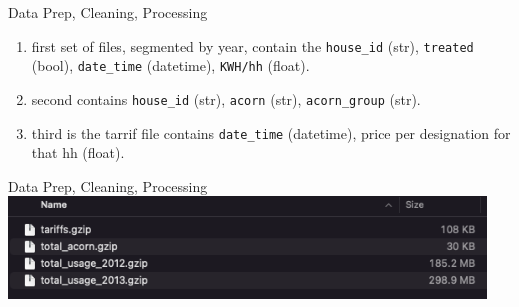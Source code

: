 \documentclass{beamer}
\begin{document}
\begin{frame}{Data Prep, Cleaning, Processing}
  \begin{enumerate}
    \item<+-> first set of files, segmented by year, contain the \texttt{house\_id} (str), \texttt{treated} (bool), \texttt{date\_time} (datetime), \texttt{KWH/hh} (float).
    \item<+-> second contains \texttt{house\_id} (str), \texttt{acorn} (str), \texttt{acorn\_group} (str).
    \item<+-> third is the tarrif file contains \texttt{date\_time} (datetime), price per designation for that hh (float).
  \end{enumerate}
\end{frame}

\begin{frame}{Data Prep, Cleaning, Processing}
  \includegraphics[width=0.95\textwidth]{images/lcl-clean-files.png}
\end{frame}
\end{document}
